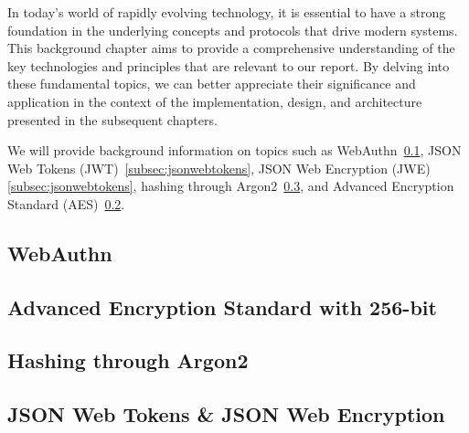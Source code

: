 
In today's world of rapidly evolving technology, it is essential to have a
strong foundation in the underlying concepts and protocols that drive modern
systems.
This background chapter aims to provide a comprehensive understanding of the key
technologies and principles that are relevant to our report.
By delving into these fundamental topics, we can better appreciate their
significance and application in the context of the implementation, design, and
architecture presented in the subsequent chapters.

We will provide background information on topics such as WebAuthn~\ref{subsec:webauthn},
JSON Web Tokens (JWT)~\ref{subsec:jsonwebtokens}, JSON Web Encryption (JWE)
\ref{subsec:jsonwebtokens}, hashing through Argon2~\ref{subsec:hashing-through-argon2},
and Advanced Encryption Standard (AES)~\ref{subsec:aes}.




\subsection{WebAuthn}\label{subsec:webauthn}


\subsection{Advanced Encryption Standard with 256-bit}\label{subsec:aes}


\subsection{Hashing through Argon2}\label{subsec:hashing-through-argon2}


\subsection{JSON Web Tokens \& JSON Web Encryption}\label{subsec:json-web-tokens}\label{subsec:jsonwebtokens}

